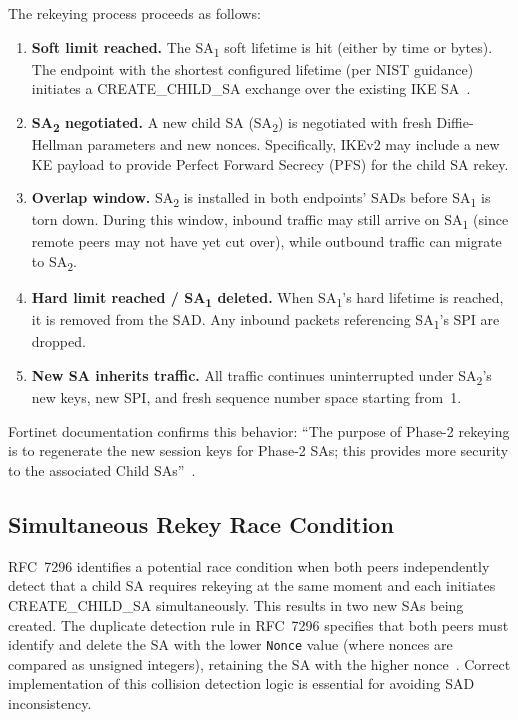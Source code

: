 \documentclass[sigconf,nonacm]{acmart}
\begin{document}
The rekeying process proceeds as follows:

\begin{enumerate}
\sloppy
  \item \textbf{Soft limit reached.} The SA\textsubscript{1} soft lifetime is hit
        (either by time or bytes). The endpoint with the shortest configured lifetime
        (per NIST guidance) initiates a CREATE\_CHILD\_SA exchange over the existing
        IKE SA~\cite{nist80077}.
  \item \textbf{SA\textsubscript{2} negotiated.} A new child SA (SA\textsubscript{2})
        is negotiated with fresh Diffie-Hellman parameters and new nonces. Specifically,
        IKEv2 may include a new KE payload to provide Perfect Forward Secrecy (PFS)
        for the child SA rekey.
  \item \textbf{Overlap window.} SA\textsubscript{2} is installed in both endpoints'
        SADs before SA\textsubscript{1} is torn down. During this window, inbound
        traffic may still arrive on SA\textsubscript{1} (since remote peers may not
        have yet cut over), while outbound traffic can migrate to SA\textsubscript{2}.
  \item \textbf{Hard limit reached / SA\textsubscript{1} deleted.} When
        SA\textsubscript{1}'s hard lifetime is reached, it is removed from the SAD.
        Any inbound packets referencing SA\textsubscript{1}'s SPI are dropped.
  \item \textbf{New SA inherits traffic.} All traffic continues uninterrupted under
        SA\textsubscript{2}'s new keys, new SPI, and fresh sequence number space
        starting from~1.
\end{enumerate}

Fortinet documentation confirms this behavior: ``The purpose of Phase-2 rekeying is to
regenerate the new session keys for Phase-2 SAs; this provides more security to the
associated Child SAs''~\cite{fortinet}.

\subsection{Simultaneous Rekey Race Condition}

RFC~7296 identifies a potential race condition when both peers independently detect
that a child SA requires rekeying at the same moment and each initiates
CREATE\_CHILD\_SA simultaneously. This results in two new SAs being created. The
duplicate detection rule in RFC~7296 specifies that both peers must identify and
delete the SA with the lower \texttt{Nonce} value (where nonces are compared as
unsigned integers), retaining the SA with the higher nonce~\cite{rfc7296}. Correct
implementation of this collision detection logic is essential for avoiding SAD
inconsistency.
\end{document}
